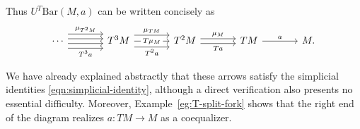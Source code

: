 \begin{example}
	Thus $U^T\mathrm{Bar}(M,a)$ can be written concisely as
	\begin{equation}\label{eqn:bar-simplicial-resolution}
		\begin{tikzcd}[column sep=large]
			\cdots \arrow[r, shift left=3, "{\mu_{T^2 M}}"] \arrow[r, shift left=1] \arrow[r, shift right=1] \arrow[r, shift right=3, "{T^3 a}"'] & T^3 M \arrow[r, shift left=2.5, "\mu_{TM}"] \arrow[r, "{T\mu_M}" description] \arrow[r, shift right=2.5, "{T^2 a}"'] & T^2 M \arrow[r, shift left, "{\mu_M}"] \arrow[shift right, r, "Ta"'] & TM \arrow[r, "a"] & M .
		\end{tikzcd}
	\end{equation}

	We have already explained abstractly that these arrows satisfy the
	simplicial identities \eqref{eqn:simplicial-identity}, although a direct
	verification also presents no essential difficulty. Moreover,
	Example~\ref{eg:T-split-fork} shows that the right end of the diagram
	realizes $a:TM\to M$ as a coequalizer.
\end{example}
